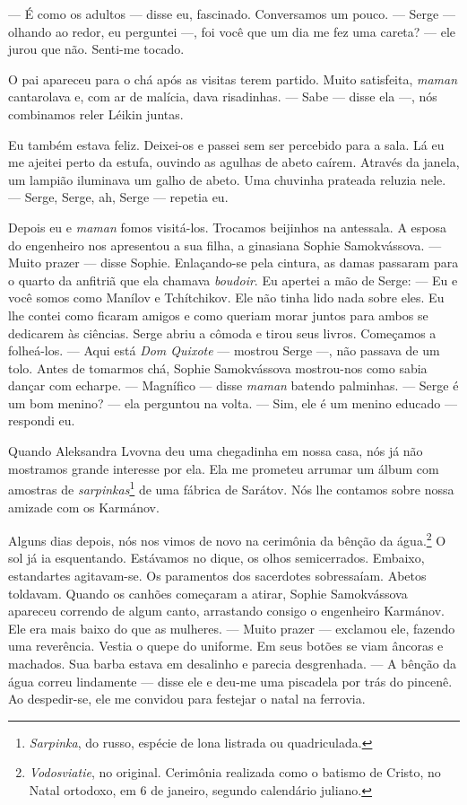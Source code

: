 --- É como os adultos --- disse eu, fascinado. Conversamos um pouco. ---
Serge --- olhando ao redor, eu perguntei ---, foi você que um dia me fez
uma careta? --- ele jurou que não. Senti-me tocado.

O pai apareceu para o chá após as visitas terem partido. Muito
satisfeita, \emph{maman} cantarolava e, com ar de malícia, dava
risadinhas. --- Sabe --- disse ela ---, nós combinamos reler Léikin
juntas.

Eu também estava feliz. Deixei-os e passei sem ser percebido para a
sala. Lá eu me ajeitei perto da estufa, ouvindo as agulhas de abeto
caírem. Através da janela, um lampião iluminava um galho de abeto. Uma
chuvinha prateada reluzia nele. --- Serge, Serge, ah, Serge --- repetia
eu.

Depois eu e \emph{maman} fomos visitá-los. Trocamos beijinhos na
antessala. A esposa do engenheiro nos apresentou a sua filha, a
ginasiana Sophie Samokvássova. --- Muito prazer --- disse Sophie.
Enlaçando-se pela cintura, as damas passaram para o quarto da anfitriã
que ela chamava \emph{boudoir}. Eu apertei a mão de Serge: --- Eu e você
somos como Manílov e Tchítchikov. Ele não tinha lido nada sobre eles. Eu
lhe contei como ficaram amigos e como queriam morar juntos para ambos se
dedicarem às ciências. Serge abriu a cômoda e tirou seus livros.
Começamos a folheá-los. --- Aqui está \emph{Dom Quixote} --- mostrou
Serge ---, não passava de um tolo. Antes de tomarmos chá, Sophie
Samokvássova mostrou-nos como sabia dançar com echarpe. --- Magnífico
--- disse \emph{maman} batendo palminhas. --- Serge é um bom menino? ---
ela perguntou na volta. --- Sim, ele é um menino educado --- respondi
eu.

Quando Aleksandra Lvovna deu uma chegadinha em nossa casa, nós já não
mostramos grande interesse por ela. Ela me prometeu arrumar um álbum com
amostras de \emph{sarpinkas}\footnote{\emph{Sarpinka}, do russo, espécie
  de lona listrada ou quadriculada.} de uma fábrica de Sarátov. Nós lhe
contamos sobre nossa amizade com os Karmánov.

Alguns dias depois, nós nos vimos de novo na cerimônia da bênção da
água.\footnote{\emph{Vodosviatie}, no original. Cerimônia realizada como
  o batismo de Cristo, no Natal ortodoxo, em 6 de janeiro, segundo
  calendário juliano.} O sol já ia esquentando. Estávamos no dique, os
olhos semicerrados. Embaixo, estandartes agitavam-se. Os paramentos dos
sacerdotes sobressaíam. Abetos toldavam. Quando os canhões começaram a
atirar, Sophie Samokvássova apareceu correndo de algum canto, arrastando
consigo o engenheiro Karmánov. Ele era mais baixo do que as mulheres.
--- Muito prazer --- exclamou ele, fazendo uma reverência. Vestia o
quepe do uniforme. Em seus botões se viam âncoras e machados. Sua barba
estava em desalinho e parecia desgrenhada. --- A bênção da água correu
lindamente --- disse ele e deu-me uma piscadela por trás do pincenê. Ao
despedir-se, ele me convidou para festejar o natal na ferrovia.

